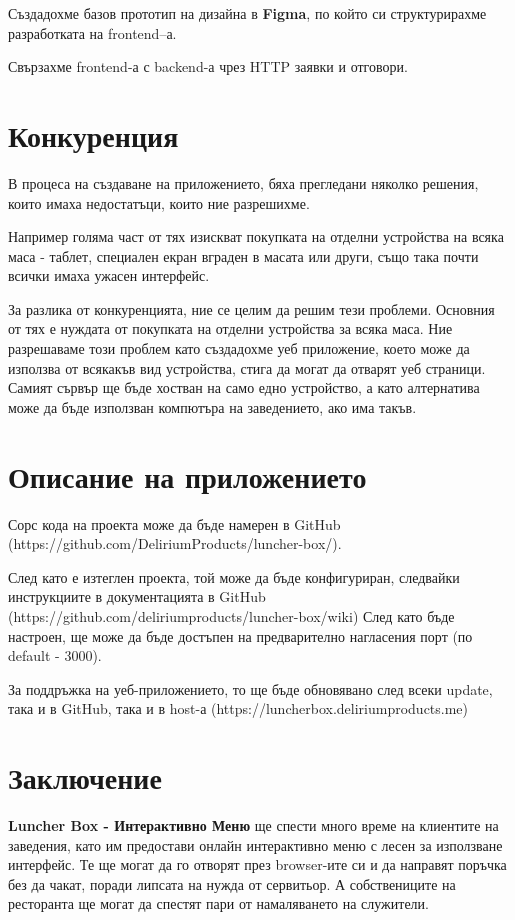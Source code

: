 \documentclass[a4paper]{article}
\begin{document}
\begin{Large}
Създадохме базов прототип на дизайна в \textbf{Figma}, по който си структурирахме разработката на frontend–а.

Свързахме frontend-а с backend-а чрез HTTP заявки и отговори.

\newpage

\section{Конкуренция}

В процеса на създаване на приложението, бяха прегледани няколко решения, които имаха недостатъци, които ние разрешихме. 

Например голяма част от тях изискват покупката на отделни устройства на всяка маса - таблет, специален екран вграден в масата или други, също така почти всички имаха ужасен интерфейс. 

За разлика от конкуренцията, ние се целим да решим тези проблеми. Основния от тях е нуждата от покупката на отделни устройства за всяка маса. Ние разрешаваме този проблем като създадохме уеб приложение, което може да използва от всякакъв вид устройства, стига да могат да отварят уеб страници. Самият сървър ще бъде хостван на само едно устройство, а като алтернатива може да бъде използван компютъра на заведението, ако има такъв.

\newpage

\section{Описание на приложението}
Сорс кода на проекта може да бъде намерен в GitHub (https://github.com/DeliriumProducts/luncher-box/).

След като е изтеглен проекта, той може да бъде конфигуриран, следвайки инструкциите в документацията в GitHub (https://github.com/deliriumproducts/luncher-box/wiki)
След като бъде настроен, ще може да бъде достъпен на предварително нагласения порт (по default - 3000).

За поддръжка на уеб-приложението, то ще бъде обновявано след всеки update, така и в GitHub, така и в host-а (https://luncherbox.deliriumproducts.me)

\newpage 

\section{Заключение}

\textbf{Luncher Box - Интерактивно Меню} ще спести много време на клиентите на заведения, като им предостави онлайн интерактивно меню с лесен за използване интерфейс.
Те ще могат да го отворят през browser-ите си и да направят поръчка без да чакат, поради липсата на нужда от сервитьор. А собствениците на ресторанта ще могат да спестят пари от намаляването на служители.


\end{Large}
\end{document}
